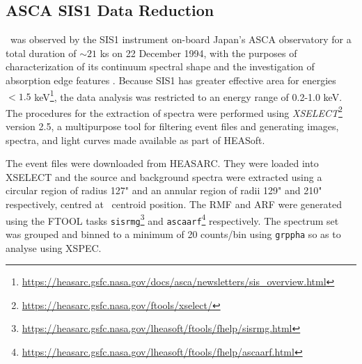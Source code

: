     	\subsection{ASCA SIS1 Data Reduction} \label{multi-obs:red-analysis:sis1}
    		\source\ was observed by the SIS1 instrument on-board Japan's ASCA observatory for a total duration of $\sim 21$ ks on 22 December 1994, with the purposes of characterization of its continuum spectral shape and the investigation of absorption edge features \cite{ebisawaAsca2001ApJ}. Because SIS1 has greater effective area for energies $<1.5$ keV\footnote{\url{https://heasarc.gsfc.nasa.gov/docs/asca/newsletters/sis_overview.html}}, the data analysis was restricted to an energy range of 0.2-1.0 keV. The procedures for the extraction of spectra were performed using \textit{XSELECT}\footnote{\url{https://heasarc.gsfc.nasa.gov/ftools/xselect/}} version 2.5, a multipurpose tool for filtering event files and generating images, spectra, and light curves made available as part of HEASoft.
    	
    		The event files were downloaded from HEASARC. They were loaded into XSELECT and the source and background spectra were extracted using a circular region of radius 127" and an annular region of radii 129" and 210" respectively, centred at \source\ centroid position. The RMF and ARF were generated using the FTOOL tasks \texttt{sisrmg}\footnote{\url{https://heasarc.gsfc.nasa.gov/lheasoft/ftools/fhelp/sisrmg.html}} and \texttt{ascaarf}\footnote{\url{https://heasarc.gsfc.nasa.gov/lheasoft/ftools/fhelp/ascaarf.html}} respectively. The spectrum set was grouped and binned to a minimum of 20 counts/bin using \texttt{grppha} so as to analyse using XSPEC.
    	
